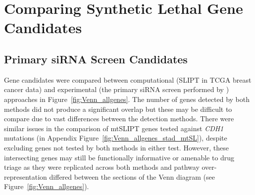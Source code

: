 

\FloatBarrier

\section{Comparing Synthetic Lethal Gene Candidates} \label{chapt3:compare_SL_genes}  



\subsection{Primary siRNA Screen Candidates} \label{chapt3:primary_screen}

Gene candidates were compared between computational (\gls{SLIPT} in \gls{TCGA} breast cancer data) and experimental (the primary \gls{siRNA} screen performed by \citet{Telford2015}) approaches in Figure~\ref{fig:Venn_allgenes}. The number of genes detected by both methods did not produce a significant overlap but these may be difficult to compare due to vast differences between the detection methods. There were similar issues in the comparison of \acrshort{mtSLIPT} genes tested against \textit{CDH1} \glspl{mutation} (in Appendix Figure~\ref{fig:Venn_allgenes_stad_mtSL}), despite excluding genes not tested by both methods in either test. However, these intersecting genes may still be functionally informative or amenable to drug triage as they were replicated across both methods and pathway over-represent\-ation differed between the sections of the Venn diagram (see Figure~\ref{fig:Venn_allgenes}).


